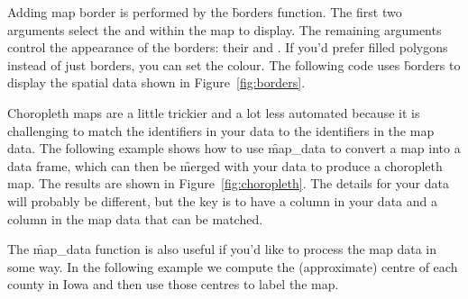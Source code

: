 Adding map border is performed by the \f{borders} function.  The first two arguments select the  and  within the map to display.  The remaining arguments control the appearance of the borders: their  and .  If you'd prefer filled polygons instead of just borders, you can set the  colour.  The following code uses \f{borders} to display the spatial data shown in Figure~\ref{fig:borders}.   

% 
% 


Choropleth maps are a little trickier and a lot less automated because it is challenging to match the identifiers in your data to the identifiers in the map data. The following example shows how to use \f{map_data} to convert a map into a data frame, which can then be \f{merge}d with your data to produce a choropleth map. The results are shown in Figure~\ref{fig:choropleth}. The details for your data will probably be different, but the key is to have a column in your data and a column in the map data that can be matched. 

% 
% 


The \f{map_data} function is also useful if you'd like to process the map data in some way.  In the following example we compute the (approximate) centre of each county in Iowa and then use those centres to label the map.

